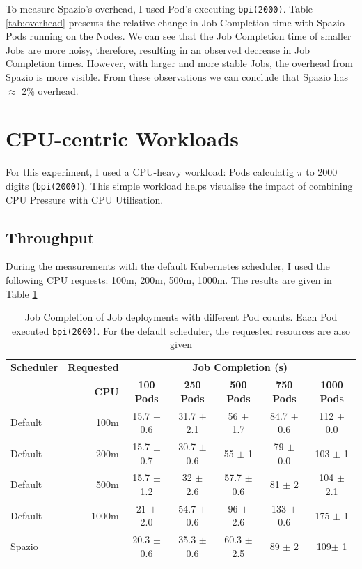 To measure Spazio's overhead, I used Pod's executing \texttt{bpi(2000)}. Table
\ref{tab:overhead} presents the relative change in Job Completion time with
Spazio Pods running on the Nodes. We can see that the Job Completion time of
smaller Jobs are more noisy, therefore, resulting in an observed decrease in Job
Completion times. However, with larger and more stable Jobs, the overhead from
Spazio is more visible. From these observations we can conclude that Spazio has
$\approx$ 2\% overhead.
%
\section{CPU-centric Workloads}
\label{sec:eval-cpu-centric}
For this experiment, I used a CPU-heavy workload: Pods calculatig $\pi$ to 2000
digits (\texttt{bpi(2000)}). This simple workload helps visualise the impact of
combining CPU Pressure with CPU Utilisation.

\subsection{Throughput}
During the measurements with the default Kubernetes scheduler, I used the
following CPU requests: 100m, 200m, 500m, 1000m. The results are given in Table
\ref{tab:pi-2000-throughput}

\begin{table}[H]
\centering
    \begin{tabular}{|l|r|c|c|c|c|c|}
    \hline
    \textbf{Scheduler} & \textbf{Requested} & \multicolumn{5}{c|}{\textbf{Job Completion (s)}} \\
    \cline{2-7}
    &  \textbf{CPU} & \textbf{100 Pods} & \textbf{250 Pods} & \textbf{500 Pods} & \textbf{750 Pods} & \textbf{1000 Pods} \\
    \hline
    Default & 100m & 15.7 $\pm$ 0.6 & 31.7 $\pm$ 2.1 & 56 $\pm$ 1.7 & 84.7 $\pm$
        0.6 & 112 $\pm$ 0.0 \\
    Default & 200m & 15.7 $\pm$ 0.7 & 30.7 $\pm$ 0.6 & 55 $\pm$ 1 & 79 $\pm$ 0.0
        & 103 $\pm$ 1 \\
    Default & 500m & 15.7 $\pm$ 1.2 & 32 $\pm$ 2.6 & 57.7 $\pm$ 0.6 & 81 $\pm$ 2
        & 104 $\pm$ 2.1 \\
    Default & 1000m & 21 $\pm$ 2.0 & 54.7 $\pm$ 0.6 & 96 $\pm$ 2.6 & 133 $\pm$
        0.6 & 175 $\pm$ 1 \\
    Spazio &  & 20.3 $\pm$ 0.6 & 35.3 $\pm$ 0.6 & 60.3 $\pm$ 2.5 & 89 $\pm$ 2 &
        109$\pm$ 1 \\
    \hline
    \end{tabular}
    \caption{Job Completion of Job deployments with different Pod counts. Each
    Pod executed \texttt{bpi(2000)}. For the default scheduler, the requested
    resources are also given}
    \label{tab:pi-2000-throughput}
\end{table}

